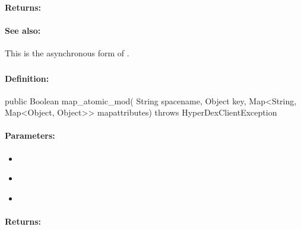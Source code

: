 \paragraph{Returns:}


\paragraph{See also:}  This is the asynchronous form of .

\pagebreak
\subsubsection{}
\label{api:java:map_atomic_mod}


\paragraph{Definition:}
\begin{javacode}
public Boolean map_atomic_mod(
        String spacename,
        Object key,
        Map<String, Map<Object, Object>> mapattributes) throws HyperDexClientException
\end{javacode}

\paragraph{Parameters:}
\begin{itemize}[noitemsep]
\item {}\\

\item {}\\

\item {}\\

\end{itemize}

\paragraph{Returns:}


